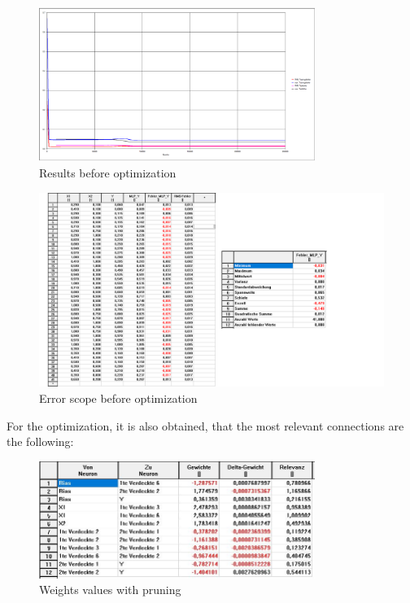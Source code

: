 \documentclass{article}
\begin{document}
\begin{doublespacing}
\begin{figure}[H] 
    \centering
    \includegraphics[width=0.8\textwidth]{Images/Fotos/Diapositiva5.PNG} 
    \caption{Results before optimization} 
    \label{fig:BeforePruning1} 
\end{figure}

\begin{figure}[H] 
    \centering
    \includegraphics[width=1.0\textwidth]{Images/Fotos/Diapositiva6.PNG} 
    \caption{Error scope before optimization} 
    \label{fig:BeforePruning2} 
\end{figure}

\par For the optimization, it is also obtained, that the most relevant connections are the following:

\begin{figure}[H] 
    \centering
    \includegraphics[width=0.8\textwidth]{Images/Photos/WeightsValuesWP.JPG} 
    \caption{Weights values with pruning} 
    \label{fig:WVWP} 
\end{figure}






\end{doublespacing}
\end{document}
